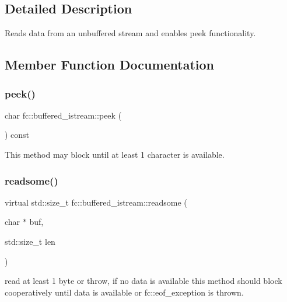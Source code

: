\subsection{Detailed Description}
Reads data from an unbuffered stream and enables peek functionality. 

\subsection{Member Function Documentation}
\mbox{\label{classfc_1_1buffered__istream_a35c2540f97e42e3281457af50a7717b9}} 
\subsubsection{\texorpdfstring{peek()}{peek()}}
{\footnotesize\ttfamily char fc\+::buffered\+\_\+istream\+::peek (\begin{DoxyParamCaption}{ }\end{DoxyParamCaption}) const\hspace{0.3cm}{\ttfamily [virtual]}}

This method may block until at least 1 character is available. \mbox{\label{classfc_1_1buffered__istream_aeadf77cad3bfaa31b52fe719f6b01fce}} 
\subsubsection{\texorpdfstring{readsome()}{readsome()}}
{\footnotesize\ttfamily virtual std\+::size\+\_\+t fc\+::buffered\+\_\+istream\+::readsome (\begin{DoxyParamCaption}\item[{char $\ast$}]{buf,  }\item[{std\+::size\+\_\+t}]{len }\end{DoxyParamCaption})\hspace{0.3cm}{\ttfamily [virtual]}}

read at least 1 byte or throw, if no data is available this method should block cooperatively until data is available or fc\+::eof\+\_\+exception is thrown.

